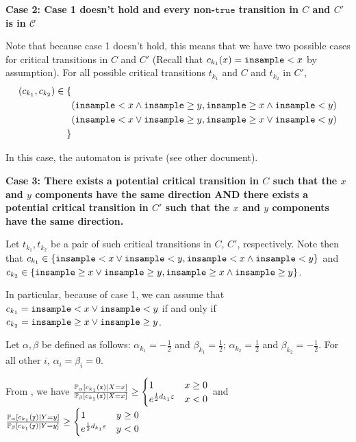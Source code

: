 \textbf{Case 2: Case 1 doesn't hold and every non-$\texttt{true}$ transition in $C$ and $C'$ is in $\mathcal{C}$}

Note that because case 1 doesn't hold, this means that we have two possible cases for critical transitions in $C$ and $C'$ (Recall that $c_{k_1}(x) = \lguard[x]$ by assumption). For all possible critical transitions $t_{k_1}$ and $C$ and $t_{k_2}$ in $C'$, 
\begin{align*}
	(c_{k_1}, c_{k_2})\in\{&\\
	&(\lguard[x]\land\gguard[y], \gguard[x]\land\lguard[y])\\	
	&(\lguard[x]\lor\gguard[y], \gguard[x]\lor\lguard[y])\\
	\}&
\end{align*}

In this case, the automaton is private (see other document). 


\textbf{Case 3: There exists a potential critical transition in $C$ such that the $x$ and $y$ components have the same direction AND there exists a potential critical transition in $C'$ such that the $x$ and $y$ components have the same direction.}

Let $t_{k_1}, t_{k_2}$ be a pair of such critical transitions in $C$, $C'$, respectively. Note then that $c_{k_1} \in \{ \lguard[x] \lor \lguard[y], \lguard[x] \land \lguard[y] \}$ and $c_{k_2} \in \{ \gguard[x] \lor \gguard[y], \gguard[x] \land \gguard[y] \}$.

In particular, because of case 1, we can assume that $c_{k_1} = \lguard[x]\lor \lguard[y]$ if and only if $c_{k_2} = \gguard[x]\lor \gguard[y]$. 

Let $\alpha, \beta$ be defined as follows: $\alpha_{k_1} = -\frac{1}{2}$ and $\beta_{k_1} = \frac{1}{2}$; $\alpha_{k_2} = \frac{1}{2}$ and $\beta_{k_2} = -\frac{1}{2}$. For all other $i$, $\alpha_i = \beta_i = 0$. 

From \cite{chadhaLinearTimeDecidability2021}, we have $\frac{\PP_\alpha[c_{k_1}(\texttt{x})|X = x]}{\PP_\beta[c_{k_1}(\texttt{x})|X = x]}\geq \begin{cases}
	1 & x \geq 0\\
	e^{\frac{1}{2}d_{k_1}\varepsilon} & x< 0
\end{cases}$ and $\frac{\PP_\alpha[c_{k_1}(\texttt{y})|Y = y]}{\PP_\beta[c_{k_1}(\texttt{y})| Y= y]}\geq \begin{cases}
	1 & y \geq 0\\
	e^{\frac{1}{2}d_{k_1}\varepsilon} & y< 0
\end{cases}$


